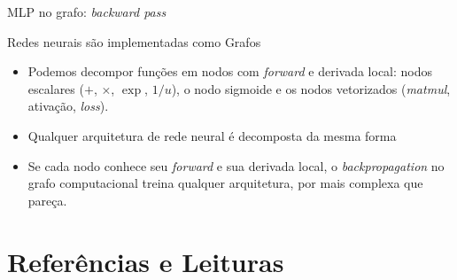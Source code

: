 \documentclass[aspectratio=169,xcolor=dvipsnames]{beamer}
\begin{document}
\begin{frame}{MLP no grafo: \textit{backward pass}}
    \medskip
    \footnotesize
    \\
  \end{frame}

  \begin{frame}{Redes neurais são implementadas como Grafos}
    \begin{itemize}
      \item Podemos decompor funções em nodos com \textit{forward} e
        derivada local: nodos escalares ($+$, $\times$, $\exp$, $1/u$), o nodo
        sigmoide e os nodos vetorizados (\textit{matmul}, ativação,
        \textit{loss}).
      \item Qualquer arquitetura de rede neural é decomposta da
        mesma forma
        
       \item Se cada nodo conhece seu \textit{forward} e sua derivada local, o \textit{backpropagation} no grafo computacional treina qualquer arquitetura, por mais complexa que pareça.
    \end{itemize}
    
    
  \end{frame}

  \section*{Referências e Leituras}
\end{document}
